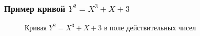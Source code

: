 \begin{frame}
    \frametitle{Пример кривой $Y^2=X^3+X+3$}

    \begin{figure}
        \begin{center}
            \caption{Кривая $Y^2=X^3+X+3$ в поле действительных чисел}\label{pict:elliptic}
        \end{center}
    \end{figure} 
\end{frame}



